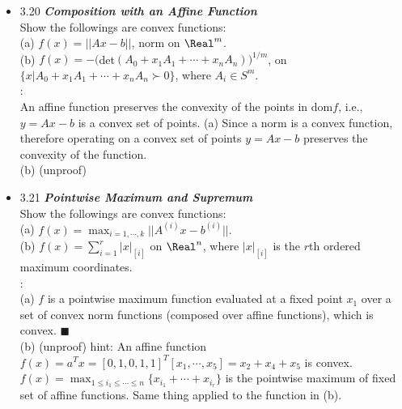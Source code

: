 \begin{itemize}
\item 3.20 {\bf\emph{Composition with an Affine Function}} \\ Show the followings are convex
functions: \\ (a) $f(x) = ||Ax-b||$, norm on $\Real^m$. \\ (b) $f(x) = -($det$(A_0 + x_1A_1 + \cdots
+ x_nA_n))^{1/m} $, on $\{ x | A_0 +x_1A_1 + \cdots +x_nA_n \succ 0 \}$, where $A_i \in S^m$. \\

   \Proof: \\ An affine function preserves the convexity of the points in dom$f$, i.e., $y=Ax-b$ is
a convex set of points.  (a) Since a norm is a convex function, therefore operating on a convex set
of points $y=Ax-b$ preserves the convexity of the function. \\ 
   (b) (unproof) \\ 

\item 3.21 {\bf\emph{Pointwise Maximum and Supremum}} \\ Show the followings are convex functions:
\\ (a) $ f(x) = \max_{i=1,\cdots,k} ||A^{(i)}x - b^{(i)}||. $ \\ (b) $ f(x) = \sum_{i=1}^r
|x|_{[i]}$ on $\Real^n$, where $|x|_{[i]}$ is the $r$th ordered maximum coordinates. \\ \Proof: \\
(a) $f$ is a pointwise maximum function evaluated at a fixed point $x_1$ over a set of convex norm
functions (composed over affine functions), which is convex. $\blacksquare$ \\ (b) (unproof) hint:
An affine function $f(x) = a^Tx = [ 0, 1, 0, 1, 1 ]^T [x_1, \cdots, x_5] = x_2 + x_4 + x_5$ is
convex. \\ $f(x) = \max_{1\le i_1 \le \cdots \le n} \{ x_{i_1} + \cdots + x_{i_r} \}$ is the
pointwise maximum of fixed set of affine functions.  Same thing applied to the function in (b). \\




\end{itemize}
